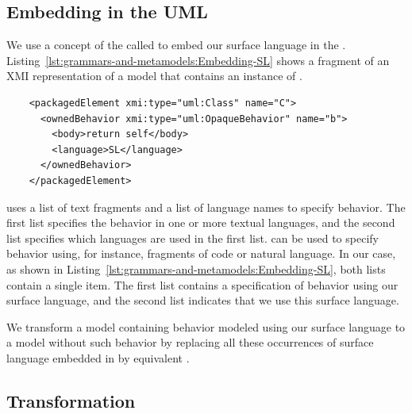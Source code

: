 \subsection{Embedding in the UML}
\label{sub:grammars-and-metamodels:UML-embedding}

We use a concept of the \UML called \OpaqueBehavior to embed our surface language in the \UML.
Listing~\ref{lst:grammars-and-metamodels:Embedding-SL} shows a fragment of an XMI representation of a \UML model that contains an instance of \OpaqueBehavior.

\begin{listing}
  \lstset{
    language=xmi,
    label=lst:grammars-and-metamodels:Embedding-SL,
    caption=Embedding in the \UML of behavior modeled using a language called `SL',
    stringstyle=\itshape
  }
  \begin{lstlisting}
    <packagedElement xmi:type="uml:Class" name="C">
      <ownedBehavior xmi:type="uml:OpaqueBehavior" name="b">
        <body>return self</body>
        <language>SL</language>
      </ownedBehavior>
    </packagedElement>
  \end{lstlisting}
\end{listing}

\OpaqueBehavior uses a list of text fragments and a list of language names to specify behavior.
The first list specifies the behavior in one or more textual languages, and the second list specifies which languages are used in the first list.
\OpaqueBehavior can be used to specify behavior using, for instance, fragments of \Java code or natural language.
In our case, as shown in Listing~\ref{lst:grammars-and-metamodels:Embedding-SL}, both lists contain a single item.
The first list contains a specification of behavior using our surface language, and the second list indicates that we use this surface language.

We transform a \UML model containing behavior modeled using our surface language to a \UML model without such behavior by replacing all these occurrences of surface language embedded in \OpaqueBehavior by equivalent \Activities.

\subsection{Transformation}
\label{sub:grammars-and-metamodels:SL-Transformation}

